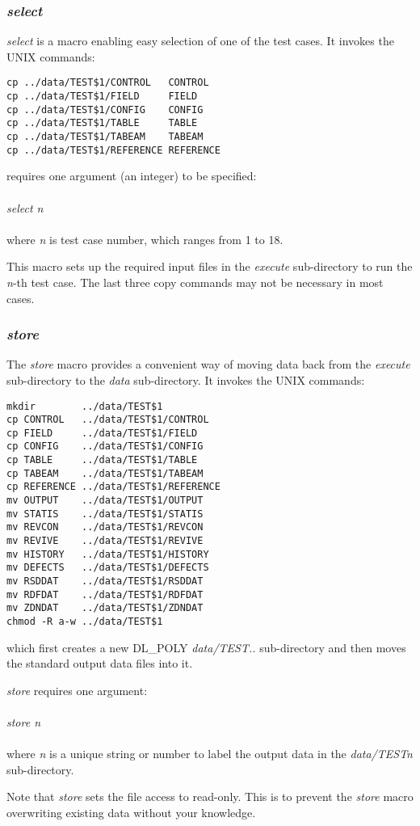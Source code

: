 \subsubsection*{{\sl select}}

{\sl select} is a macro enabling easy selection of one of the test
cases.  It invokes the UNIX commands:

\begin{verbatim}
cp ../data/TEST$1/CONTROL   CONTROL
cp ../data/TEST$1/FIELD     FIELD
cp ../data/TEST$1/CONFIG    CONFIG
cp ../data/TEST$1/TABLE     TABLE
cp ../data/TEST$1/TABEAM    TABEAM
cp ../data/TEST$1/REFERENCE REFERENCE
\end{verbatim}

 requires one argument (an integer) to be specified: \\
\\
{\sl select n} \\
\\
\noindent where {\sl n} is test case number, which ranges from 1 to
18.

This macro sets up the required input files in the {\em execute}
sub-directory to run the {\sl n}-th test
case.  The last three copy commands may not be necessary in
most cases.

\subsubsection*{{\sl store}}

The {\sl store} macro provides a convenient way of moving data
back from the {\em execute} sub-directory to
the {\em data} sub-directory.  It invokes the
UNIX commands:

\begin{verbatim}
mkdir        ../data/TEST$1
cp CONTROL   ../data/TEST$1/CONTROL
cp FIELD     ../data/TEST$1/FIELD
cp CONFIG    ../data/TEST$1/CONFIG
cp TABLE     ../data/TEST$1/TABLE
cp TABEAM    ../data/TEST$1/TABEAM
cp REFERENCE ../data/TEST$1/REFERENCE
mv OUTPUT    ../data/TEST$1/OUTPUT
mv STATIS    ../data/TEST$1/STATIS
mv REVCON    ../data/TEST$1/REVCON
mv REVIVE    ../data/TEST$1/REVIVE
mv HISTORY   ../data/TEST$1/HISTORY
mv DEFECTS   ../data/TEST$1/DEFECTS
mv RSDDAT    ../data/TEST$1/RSDDAT
mv RDFDAT    ../data/TEST$1/RDFDAT
mv ZDNDAT    ../data/TEST$1/ZDNDAT
chmod -R a-w ../data/TEST$1
\end{verbatim}

\noindent which first creates a new DL\_POLY {\em data/TEST..}
sub-directory and then moves the standard \D
output data files into it.

{\sl store} requires one argument:\\
\\
{\sl store n}\\
\\
\noindent where {\sl n} is a unique string or number to label the
output data in the {\em data/TESTn} sub-directory.

Note that {\sl store} sets the file access to read-only.  This is
to prevent the {\sl store} macro overwriting existing data without
your knowledge.
